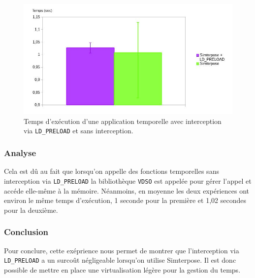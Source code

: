 \begin{figure}[H]
  \centering
    \includegraphics[scale=0.50]{mesures/graph/global_time.jpg}
    \caption{Temps d'exécution d'une application temporelle avec interception via \texttt{LD\_PRELOAD} et sans interception.}
    \label{Temps_FM}
\end{figure}

\subsubsection{Analyse}
Cela est dû au fait que lorsqu'on appelle des fonctions temporelles sans interception via \texttt{LD\_PRELOAD} la bibliothèque \texttt{VDSO} est appelée pour gérer l'appel et accéde elle-même à la mémoire. Néanmoins, en moyenne les deux expériences ont environ le même temps d'exécution, 1 seconde pour la première et 1,02 secondes pour la deuxième.

\subsubsection{Conclusion}
Pour conclure, cette exéprience nous permet de montrer que l'interception via \texttt{LD\_PRELOAD} a un surcoût négligeable lorsqu'on utilise Simterpose. Il est donc possible de mettre en place une virtualisation légère pour la gestion du temps.


